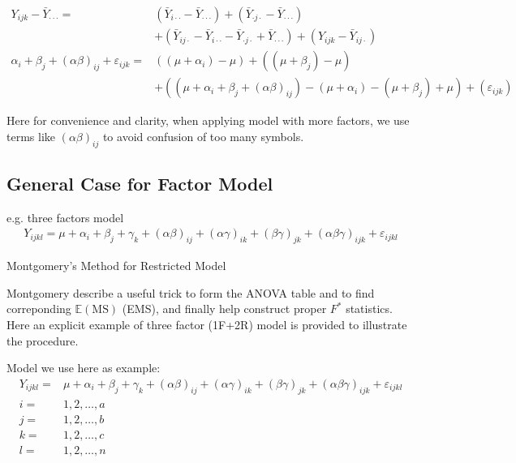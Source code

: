 \begin{align}
    Y_{ijk}-\bar{Y}_{\cdot \cdot \cdot }=&\left(\bar{Y}_{i\cdot \cdot}-\bar{Y}_{\cdot \cdot \cdot}\right)+\left(\bar{Y}_{\cdot j\cdot }-\bar{Y}_{\cdot \cdot \cdot }\right)\\
    &+\left(\bar{Y}_{ij\cdot }-\bar{Y}_{i\cdot \cdot }-\bar{Y}_{\cdot j\cdot }+\bar{Y}_{\cdot \cdot \cdot }\right)+  \left( Y_{ijk}-\bar{Y}_{ij\cdot}\right)\\
    \alpha _i+\beta _j+(\alpha \beta )_{ij}+\varepsilon _{ijk}=&\left((\mu +\alpha _i)-\mu \right)+\left((\mu +\beta _j)-\mu \right)\\
    &+\left( (\mu +\alpha _i+\beta _j+(\alpha \beta )_{ij})-(\mu +\alpha _i)-(\mu +\beta _j)+\mu  \right)+\left(\varepsilon _{ijk}\right)
    \end{align}
    
    
    
    
    
    Here for convenience and clarity, when applying model with more factors, we use terms like $ (\alpha \beta )_{ij} $ to avoid confusion of too many symbols.


\subsection{General Case for Factor Model}\label{SubSubSectionBiosGeneralCaseForFactorModel}

e.g. three factors model 
\begin{align}
    Y_{ijkl} = \mu +\alpha _i +\beta _j+\gamma _k +(\alpha \beta )_{ij}+(\alpha \gamma )_{ik}+(\beta \gamma )_{jk}+(\alpha \beta \gamma )_{ijk}+\varepsilon _{ijkl}
\end{align}


\begin{point}
    Montgomery's Method for Restricted Model
\end{point}

    Montgomery describe a useful trick to form the ANOVA table and to find correponding $ \mathbb{E}\left( \mathrm{MS} \right)  $ (EMS), and finally help construct proper $ F^* $ statistics.
    Here an explicit example of three factor (1F+2R) model is provided to illustrate the procedure.

    Model we use here as example:
    \begin{align}
         Y_{ijkl}=&\mu +\alpha _i+\beta _j+\gamma _k+(\alpha \beta )_{ij}+(\alpha \gamma )_{ik}+(\beta \gamma )_{jk}+(\alpha \beta \gamma )_{ijk}+\varepsilon _{ijkl}\\
         i=&1,2,\ldots,a\\
         j=&1,2,\ldots,b\\
         k=&1,2,\ldots,c\\
         l=&1,2,\ldots,n
    \end{align}

